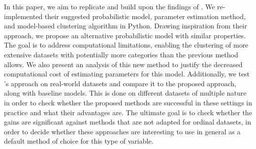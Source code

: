 In this paper, we aim to replicate and build upon the findings of \cite{biernacki2016model}. We re-implemented their suggested probabilistic model, parameter estimation method, and model-based clustering algorithm in Python. Drawing inspiration from their approach, we propose an alternative probabilistic model with similar properties. The goal is to address computational limitations, enabling the clustering of more extensive datasets with potentially more categories than the previous method allows. We also present an analysis of this new method to justify the decreased computational cost of estimating parameters for this model. Additionally, we  test \cite{biernacki2016model}'s approach on real-world datasets and compare it to the proposed approach, along with baseline models. This is done on different datasets of multiple nature in order to check whether the proposed methods are successful in these settings in practice and what their advantages are. The ultimate goal is to check whether the gains are significant against methods that are not adapted for ordinal datasets, in order to decide whether these approaches are interesting to use in general as a default method of choice for this type of variable.



